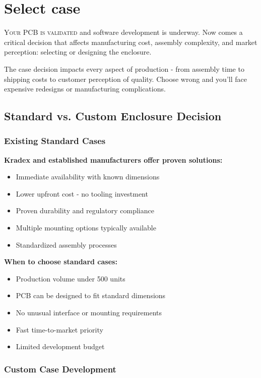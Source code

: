 \chapter{Select case}

\lettrine{Y}{our PCB is validated} and software development is underway. Now comes a critical decision that affects manufacturing cost, assembly complexity, and market perception: selecting or designing the enclosure.

The case decision impacts every aspect of production - from assembly time to shipping costs to customer perception of quality. Choose wrong and you'll face expensive redesigns or manufacturing complications.

\section{Standard vs. Custom Enclosure Decision}

\subsection{Existing Standard Cases}

\textbf{Kradex and established manufacturers offer proven solutions:}
\begin{itemize}
\item Immediate availability with known dimensions
\item Lower upfront cost - no tooling investment
\item Proven durability and regulatory compliance
\item Multiple mounting options typically available
\item Standardized assembly processes
\end{itemize}

\textbf{When to choose standard cases:}
\begin{itemize}
\item Production volume under 500 units
\item PCB can be designed to fit standard dimensions
\item No unusual interface or mounting requirements
\item Fast time-to-market priority
\item Limited development budget
\end{itemize}

\subsection{Custom Case Development}

